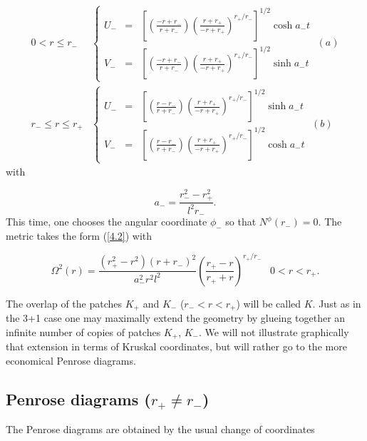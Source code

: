 \documentclass[12pt]{article}
\newcounter{c1} \newcounter{c2}
\newcommand{\bb}{\begin{equation}}
\newcommand{\ee}{\end{equation}}
\begin{document}
\begin{equation} \begin{array}{cl}
0 <r \leq r_{-} & \left\{ \begin{array}{lcr}
U_{-} &=& \left[ \left( \frac{-r+r_{-}}{r+r_{-}} \right)\left(
\frac{r+r_{+}}{-r+r_{+}} \right)^{r_{+}/r_{-}} \right]^{1/2}
\cosh a_- t  \\
V_{-} &=& \left[ \left( \frac{-r+r_{-}}{r+r_{-}} \right)\left(
\frac{r+r_{+}}{-r+r_{+}} \right)^{r_{+}/r_{-}} \right]^{1/2}
\sinh a_- t
 \end{array}  \right. \; (a) \\
r_{-} \leq r \leq r_{+} & \left\{  \begin{array}{lcr}
U_{-} &=& \left[ \left( \frac{r-r_-}{r+r_-} \right)\left(
\frac{r+r_{+}}{-r+r_{+}} \right)^{r_{+}/r_{-}} \right]^{1/2}
\sinh a_- t \\
V_{-} &=& \left[ \left( \frac{r-r_-}{r+r_-} \right)\left(
\frac{r+r_{+}}{-r+r_{+}} \right)^{r_{+}/r_{-}} \right]^{1/2}
\cosh a_{-} t
\end{array}  \right. \;(b)
\end{array} \label{4.7}
\end{equation}
%
with

\bb
a_{-} = \frac{r_{-}^2 - r_{+}^2}{l^2 r_{-}}.
\label{4.8}
\ee
%
This time, one chooses the angular coordinate $\phi_{-}$ so that
$N^{\phi}(r_{-}) = 0$. The metric takes the form (\ref{4.2}) with

\begin{equation}
\Omega^2 (r)= \frac{(r_{+}^2-r^2)(r+r_{-})^2}{a_{-}^2 r^2 l^2} \left(
\frac{r_{+}-r}{r_{+}+r} \right)^{r_{+}/r_{-}} \;\;\; 0< r < r_{+}.
\label{4.9}
\end{equation}

The overlap  of the patches $K_{+}$ and $K_{-}$
($r_{-}<r<r_{+}$) will be called $K$. Just as in the 3+1 case
one may maximally extend the geometry by glueing together an
infinite number of copies of patches $K_{+}$, $K_{-}$. We will
not illustrate graphically that extension in terms of Kruskal
coordinates, but will rather go to the more economical Penrose
diagrams.



\subsection{Penrose diagrams ($r_+ \neq r_-$)}


The Penrose diagrams are obtained by the usual change of coordinates
\end{document}
